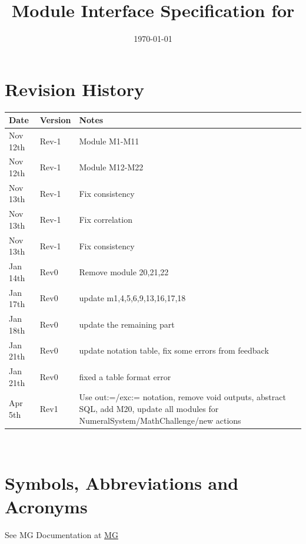 \documentclass[12pt, titlepage]{article}
\begin{document}
\title{Module Interface Specification for \progname{}}

\author{\authname}

\date{\today}

\maketitle


\section{Revision History}

\begin{tabularx}{\textwidth}{p{3cm}p{2cm}X}
\toprule {\bf Date} & {\bf Version} & {\bf Notes}\\
\midrule
Nov 12th & Rev-1 & Module M1-M11\\
Nov 12th & Rev-1 & Module M12-M22\\
Nov 13th & Rev-1 & Fix consistency\\
Nov 13th & Rev-1 & Fix correlation\\
Nov 13th & Rev-1 & Fix consistency\\
Jan 14th & Rev0 & Remove module 20,21,22\\ 
Jan 17th & Rev0 & update m1,4,5,6,9,13,16,17,18\\
Jan 18th & Rev0 & update the remaining part\\
Jan 21th & Rev0 & update notation table, fix some errors from feedback\\
Jan 21th & Rev0 & fixed a table format error\\
Apr 5th & Rev1 & Use out:=/exc:= notation, remove void outputs, abstract SQL, add M20, update all modules for NumeralSystem/MathChallenge/new actions\\
\bottomrule
\end{tabularx}

~\newpage

\section{Symbols, Abbreviations and Acronyms}

See MG Documentation at 
\href{https://github.com/The-Crazy-Four-Games/Crazy-Eights-Game/blob/main/docs/Design/SoftArchitecture/MG.pdf}{MG}

\newpage

\tableofcontents
\end{document}
